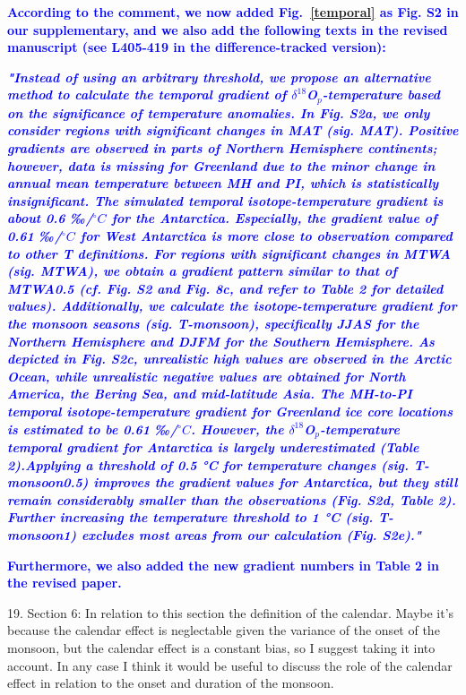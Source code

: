 \documentclass[gmd, manuscript]{copernicus}
\begin{document}
\medskip
\textcolor{blue}{\textbf{According to the comment, we now added Fig.~\ref{temporal} as Fig. S2 in our supplementary, and we also add the following texts in the revised manuscript (see L405-419 in the difference-tracked version):}}

\textcolor{blue}{\textbf{\textit{"Instead of using an arbitrary  threshold, we propose an alternative method to calculate the temporal gradient of  $\delta^{18}$O$_p$-temperature based on the significance of temperature anomalies. In Fig. S2a, we only consider regions with significant changes in MAT (sig. MAT). Positive gradients are observed in parts of Northern Hemisphere continents; however, data is missing for  Greenland due to the minor change in annual mean temperature between MH and PI, which is statistically insignificant. The simulated temporal isotope-temperature gradient is about 0.6  ‰/$^{\circ}C$ for the Antarctica. Especially, the gradient value of 0.61 ‰/$^{\circ}C$ for West Antarctica is more close to observation compared to other T definitions. For regions with significant changes in MTWA (sig. MTWA), we obtain a gradient pattern similar to that of MTWA0.5 (cf. Fig. S2 and Fig. 8c, and refer to Table 2 for detailed values). Additionally, we calculate the isotope-temperature gradient for the monsoon seasons (sig. T-monsoon), specifically JJAS for the Northern Hemisphere and DJFM for the Southern Hemisphere.  As depicted in Fig. S2c,  unrealistic high values are observed in the Arctic Ocean, while unrealistic negative values are obtained for North America, the Bering Sea, and mid-latitude Asia. The MH-to-PI temporal isotope-temperature gradient for Greenland ice core locations is estimated to be 0.61 ‰/$^{\circ}C$. However, the $\delta^{18}$O$_p$-temperature temporal gradient for Antarctica is largely underestimated (Table 2).Applying a threshold of 0.5 °C for temperature changes (sig. T-monsoon0.5) improves the gradient values for Antarctica, but they still remain considerably smaller than the observations  (Fig. S2d, Table 2).  Further increasing the  temperature threshold to 1 °C (sig. T-monsoon1) excludes most areas from our calculation (Fig. S2e)."}}}

\medskip

\textcolor{blue}{\textbf{Furthermore, we also added the new gradient numbers in Table 2 in the revised paper.}}

\medskip


19. Section 6: In relation to this section the definition of the calendar. Maybe it’s because the calendar effect is neglectable given the variance of the onset of the monsoon, but the calendar effect is a constant bias, so I suggest taking it into account. In any case I think it would be useful to discuss the role of the calendar effect in relation to the onset and duration of the monsoon.
\end{document}
